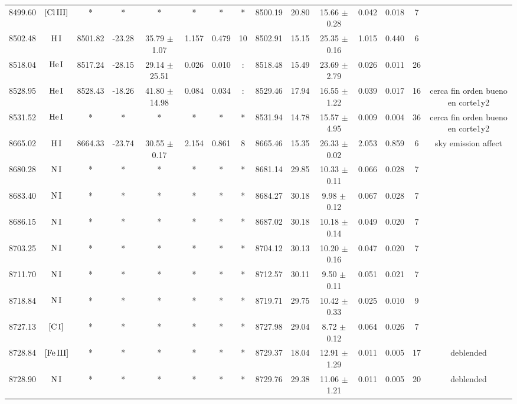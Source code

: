 \documentclass{article}
\begin{document}
\begin{table*}
\begin{adjustbox}{width=\textwidth}
\begin{tabular}{ccccccccccccccc}
8499.60 & $\mbox{[Cl}\thinspace \mbox{III]}$ & * & * & * & * & * & * & 8500.19 & 20.80 & 15.66 $\pm$ 0.28 & 0.042 & 0.018 & 7 &  \\
8502.48 & $\mbox{H}\thinspace \mbox{I}$ & 8501.82 & -23.28 & 35.79 $\pm$ 1.07 & 1.157 & 0.479 & 10 & 8502.91 & 15.15 & 25.35 $\pm$ 0.16 & 1.015 & 0.440 & 6 &  \\
8518.04 & $\mbox{He}\thinspace \mbox{I}$ & 8517.24 & -28.15 & 29.14 $\pm$ 25.51 & 0.026 & 0.010 & : & 8518.48 & 15.49 & 23.69 $\pm$ 2.79 & 0.026 & 0.011 & 26 &  \\
8528.95 & $\mbox{He}\thinspace \mbox{I}$ & 8528.43 & -18.26 & 41.80 $\pm$ 14.98 & 0.084 & 0.034 & : & 8529.46 & 17.94 & 16.55 $\pm$ 1.22 & 0.039 & 0.017 & 16 &  cerca fin orden bueno en corte1y2 \\
8531.52 & $\mbox{He}\thinspace \mbox{I}$ & * & * & * & * & * & * & 8531.94 & 14.78 & 15.57 $\pm$ 4.95 & 0.009 & 0.004 & 36 &  cerca fin orden bueno en corte1y2 \\
8665.02 & $\mbox{H}\thinspace \mbox{I}$ & 8664.33 & -23.74 & 30.55 $\pm$ 0.17 & 2.154 & 0.861 & 8 & 8665.46 & 15.35 & 26.33 $\pm$ 0.02 & 2.053 & 0.859 & 6 &  sky emission affect \\
8680.28 & $\mbox{N}\thinspace \mbox{I}$ & * & * & * & * & * & * & 8681.14 & 29.85 & 10.33 $\pm$ 0.11 & 0.066 & 0.028 & 7 &  \\
8683.40 & $\mbox{N}\thinspace \mbox{I}$ & * & * & * & * & * & * & 8684.27 & 30.18 & 9.98 $\pm$ 0.12 & 0.067 & 0.028 & 7 &  \\
8686.15 & $\mbox{N}\thinspace \mbox{I}$ & * & * & * & * & * & * & 8687.02 & 30.18 & 10.18 $\pm$ 0.14 & 0.049 & 0.020 & 7 &  \\
8703.25 & $\mbox{N}\thinspace \mbox{I}$ & * & * & * & * & * & * & 8704.12 & 30.13 & 10.20 $\pm$ 0.16 & 0.047 & 0.020 & 7 &  \\
8711.70 & $\mbox{N}\thinspace \mbox{I}$ & * & * & * & * & * & * & 8712.57 & 30.11 & 9.50 $\pm$ 0.11 & 0.051 & 0.021 & 7 &  \\
8718.84 & $\mbox{N}\thinspace \mbox{I}$ & * & * & * & * & * & * & 8719.71 & 29.75 & 10.42 $\pm$ 0.33 & 0.025 & 0.010 & 9 &  \\
8727.13 & $\mbox{[C}\thinspace \mbox{I]}$ & * & * & * & * & * & * & 8727.98 & 29.04 & 8.72 $\pm$ 0.12 & 0.064 & 0.026 & 7 &  \\
8728.84 & $\mbox{[Fe}\thinspace \mbox{III]}$ & * & * & * & * & * & * & 8729.37 & 18.04 & 12.91 $\pm$ 1.29 & 0.011 & 0.005 & 17 &  deblended \\
8728.90 & $\mbox{N}\thinspace \mbox{I}$ & * & * & * & * & * & * & 8729.76 & 29.38 & 11.06 $\pm$ 1.21 & 0.011 & 0.005 & 20 &  deblended \\

\end{tabular}
\end{adjustbox}
\end{table*}
\end{document}
